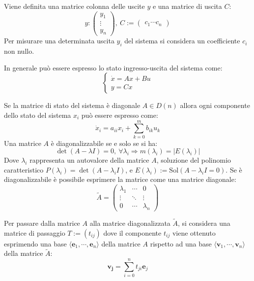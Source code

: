 \documentclass{article}
\numberwithin{equation}{subsection}
\begin{document}
Viene definita una matrice colonna delle uscite $y$ e una matrice di uscita $C$:
\begin{equation*}
    y:
    \begin{pmatrix}
        y_1\\
        \vdots\\
        y_n
    \end{pmatrix}
    ,\:
    C:=
    \begin{pmatrix}
        c_1 \cdots c_n
    \end{pmatrix}
\end{equation*}
Per misurare una determinata uscita $y_i$ del sistema si considera un coefficiente $c_i$ non nullo. 

In generale può essere espresso lo stato ingresso-uscita del sistema come:
\begin{equation}
    \begin{cases}
        \dot x=Ax+Bu\\
        y=Cx
    \end{cases}
\end{equation}

Se la matrice di stato del sistema è diagonale $A\in D(n)$ allora ogni componente dello stato del sistema $x_i$ può essere espresso come:
\begin{equation*}
    \dot x_i=a_{ii}x_i+\displaystyle\sum_{k=0}^{m}b_{ik}u_k
\end{equation*}
Una matrice $A$ è diagonalizzabile se e solo se si ha:
\begin{equation*}
    \det(A-\lambda I)=0,\:\forall\lambda_i\Rightarrow m(\lambda_i)=|E(\lambda_i)|
\end{equation*}
Dove $\lambda_i$ rappresenta un autovalore della matrice $A$, soluzione del polinomio caratteristico $P(\lambda_i)=\det(A-\lambda_iI)$, e $E(\lambda_i):=\mathrm{Sol}(A-\lambda_iI=0)$. 
Se è diagonalizzabile è possibile esprimere la matrice come una matrice diagonale:
\begin{equation*}
    \tilde A=
    \begin{pmatrix}
        \lambda_1 &\cdots& 0\\
        \vdots& \ddots &\vdots\\
        0&\cdots&\lambda_n
    \end{pmatrix}
\end{equation*}


Per passare dalla matrice $A$ alla matrice diagonalizzata $\tilde A$, si considera una matrice di passaggio $T:=(t_{ij})$ dove il componente $t_{ij}$ viene ottenuto esprimendo 
una base $\langle\mathbf{e}_1,\cdots,\mathbf{e}_n\rangle$ della matrice $A$ rispetto ad una base $\langle\mathbf{v}_1,\cdots,\mathbf{v}_n\rangle$ della matrice $\tilde A$:
\begin{equation*}
    \mathbf{v_j}=\displaystyle\sum_{i=0}^{n}t_{ji}\mathbf{e}_j
\end{equation*}
\end{document}
